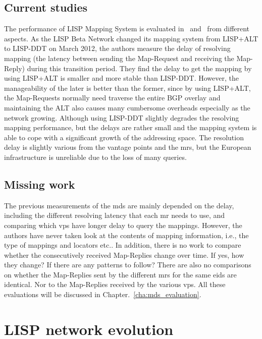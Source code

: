 \subsection{Current studies}
\label{subsec:mds_studies}
The performance of LISP Mapping System is evaluated in~\cite{lispCCR} and~\cite{coras2014performance} from different aspects. As the LISP Beta Network changed its mapping system from LISP+ALT to LISP-DDT on March  2012, the authors measure the delay of resolving mapping (the latency between sending the Map-Request and receiving the Map-Reply) during this transition period. They find the delay to get the mapping by using LISP+ALT is smaller and more stable than LISP-DDT. However, the manageability of the later is better than the former, since by using LISP+ALT, the Map-Requests normally need traverse the entire BGP overlay and maintaining the ALT also causes many cumbersome overheads especially as the network growing. Although using LISP-DDT slightly degrades the resolving mapping performance, but the delays are rather small and the mapping system is able to cope with a significant growth of the addressing space. The resolution delay is slightly various from the vantage points and the \acrshort{mr}s, but the European infrastructure is unreliable due to the loss of many queries.

\subsection{Missing work}
\label{subsec:mds_missing}
The previous measurements of the \acrshort{mds} are mainly depended on the delay, including the different resolving latency that each \acrshort{mr} needs to use, and comparing which \acrshort{vp}s have longer delay to query the mappings. However, the authors have never taken look at the contents of mapping information, i.e., the type of mappings and locators etc.. In addition, there is no work to compare whether the consecutively received Map-Replies change over time. If yes, how they change? If there are any patterns to follow? There are also no comparisons on whether the Map-Replies sent by the different \acrshort{mr}s for the same \acrshort{eid}s are identical. Nor to the Map-Replies received by the various \acrshort{vp}s. All these evaluations will be discussed in Chapter.~\ref{cha:mds_evaluation}.


\section{LISP network evolution}
\label{sec:evolution}

